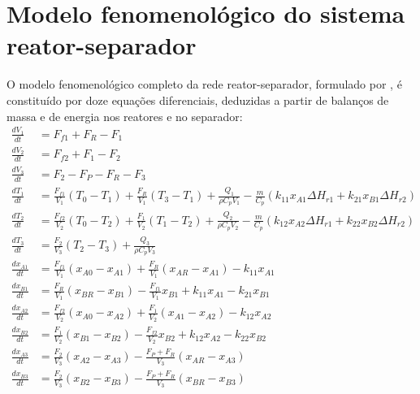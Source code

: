 \appendix

\appendixpage
\addappheadtotoc

\section{Modelo fenomenológico do sistema reator-separador}
\label{sec:apendice_modelo}

O modelo fenomenológico completo da rede reator-separador, formulado por \textcite{pourkargar_2017}, é constituído por doze equações diferenciais, deduzidas a partir de balanços de massa e de energia nos reatores e no separador:
\begin{align}
  \frac{dV_1}{dt}    & = F_{f1} + F_R - F_1                                                                                                                                               \\
  \frac{dV_2}{dt}    & = F_{f2} + F_1 - F_2                                                                                                                                               \\
  \frac{dV_3}{dt}    & = F_2 - F_P - F_R - F_3                                                                                                                                            \\
  \frac{dT_1}{dt}    & = \frac{F_{f1}}{V_1}(T_0 - T_1) + \frac{F_R}{V_1}(T_3 - T_1) + \frac{Q_1}{\rho C_p V_1} - \frac{m}{C_p}(k_{11} x_{A1} \Delta H_{r1} + k_{21} x_{B1} \Delta H_{r2}) \\
  \frac{dT_2}{dt}    & = \frac{F_{f2}}{V_2}(T_0 - T_2) + \frac{F_1}{V_2}(T_1 - T_2) + \frac{Q_2}{\rho C_p V_2} - \frac{m}{C_p}(k_{12} x_{A2} \Delta H_{r1} + k_{22} x_{B2} \Delta H_{r2}) \\
  \frac{dT_3}{dt}    & = \frac{F_2}{V_3}(T_2 - T_3) + \frac{Q_3}{\rho C_p V_3}                                                                                                            \\
  \frac{dx_{A1}}{dt} & = \frac{F_{f1}}{V_1}(x_{A0} - x_{A1}) + \frac{F_R}{V_1}(x_{AR} - x_{A1}) - k_{11} x_{A1}                                                                           \\
  \frac{dx_{B1}}{dt} & = \frac{F_R}{V_1}(x_{BR} - x_{B1}) - \frac{F_{f1}}{V_1} x_{B1} + k_{11} x_{A1} - k_{21} x_{B1}                                                                     \\
  \frac{dx_{A2}}{dt} & = \frac{F_{f2}}{V_2}(x_{A0} - x_{A2}) + \frac{F_1}{V_2}(x_{A1} - x_{A2}) - k_{12} x_{A2}                                                                           \\
  \frac{dx_{B2}}{dt} & = \frac{F_1}{V_2}(x_{B1} - x_{B2}) - \frac{F_{f2}}{V_2} x_{B2} + k_{12} x_{A2} - k_{22} x_{B2}                                                                     \\
  \frac{dx_{A3}}{dt} & = \frac{F_2}{V_3}(x_{A2} - x_{A3}) - \frac{F_P + F_R}{V_3}(x_{AR} - x_{A3})                                                                                        \\
  \frac{dx_{B3}}{dt} & = \frac{F_2}{V_3}(x_{B2} - x_{B3}) - \frac{F_P + F_R}{V_3}(x_{BR} - x_{B3})
\end{align}
